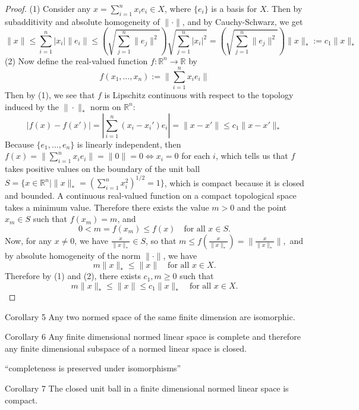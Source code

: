 \begin{proof}
    (1) Consider any $x=\sum_{i=1}^n x_ie_i\in X$, where $\{e_i\}$ is a basis for $X$.
    Then by subadditivity and absolute homogeneity of $\|\cdot\|$, and by Cauchy-Schwarz, we get
    \[
      \|x\|
      \le\sum_{i=1}^n|x_i|\|e_i\|
      \le\left(\sqrt{\sum_{j=1}^n\|e_j\|^2}\right)\sqrt{\sum_{j=1}^n|x_i|^2}
      =\left(\sqrt{\sum_{j=1}^n\|e_j\|^2}\right)\|x\|_*
      :=c_1\|x\|_*\tag{1}
    \]
    (2) Now define the real-valued function $f:\mathbb{R}^n\to\mathbb{R}$ by
    \[
        f(x_1,\dots,x_n):=\|\sum_{i=1}^n x_ie_i\|
    \]
    Then by (1), we see that $f$ is Lipschitz continuous with respect to the topology induced by the $\|\cdot\|_*$ norm on $\mathbb{R}^n$:
    \[
      |f(x)-f(x')|=|\sum_{i=1}^n (x_i-x_i')e_i|=\|x-x'\|\le c_1\|x-x'\|_*
    \]
    Because $\{e_1,\dots,e_n\}$ is linearly independent, then $f(x)=\|\sum_{i=1}^n x_ie_i\|=\|0\|=0\iff x_i=0$ for each $i$, which tells us that $f$ takes positive values on the boundary of the unit ball $S=\{x\in\mathbb{R}^n\mid \|x\|_*=(\sum_{i=1}^n x_i^2)^{1/2}=1\}$, which is compact because it is closed and bounded.
    A continuous real-valued function on a compact topological space takes a minimum value.
    Therefore there exists the value $m>0$ and the point $x_m\in S$ such that $f(x_m)=m$, and 
    \[
        0<m=f(x_m)\le f(x)\quad\text{for all }x\in S.
    \]
    Now, for any $x\neq0$, we have $\frac{x}{\|x\|_*}\in S$, so that 
    $
        m\le f(\frac{x}{\|x\|_*})=\|\frac{x}{\|x\|_*}\|,
    $
    and by absolute homogeneity of the norm $\|\cdot\|$, we have
    \[
        m\|x\|_*\le \|x\|\quad\text{for all }x\in X.\tag{2}
    \]  
    Therefore by (1) and (2), there exists $c_1,m\ge0$ such that 
    \[
        m\|x\|_*\le \|x\|\le c_1\|x\|_*\quad\text{for all }x\in X.
    \] 

\end{proof}
\begin{namedthm*}{Corollary 5}
    Any two normed space of the same finite dimension are isomorphic.
\end{namedthm*}
\begin{namedthm*}{Corollary 6}
    Any finite dimensional normed linear space is complete and therefore any finite dimensional subspace of a normed linear space is closed.
\end{namedthm*}
``completeness is preserved under isomorphisms''
\begin{namedthm*}{Corollary 7}
    The closed unit ball in a finite dimensional normed linear space is compact.
\end{namedthm*}
